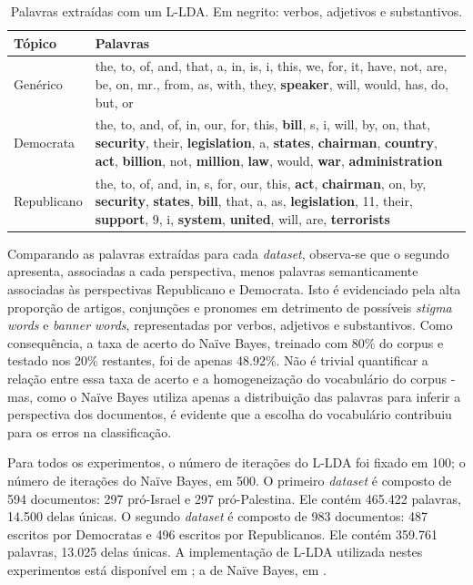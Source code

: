 \begin{table}[h]
\centering
\begin{tabular}{| l | p{10cm} | }
\hline
Tópico & Palavras \\ \hline
Genérico & the, to, of, and, that, a, in, is, i, this, we, for, it, have, not, are, be, on, mr., from, as, with, they, \textbf{speaker}, will, would, has, do, but, or\\ \hline
Democrata & the, to, and, of, in, our, for, this, \textbf{bill}, s, i, will, by, on, that, \textbf{security}, their, \textbf{legislation}, a, \textbf{states}, \textbf{chairman}, \textbf{country}, \textbf{act}, \textbf{billion}, not, \textbf{million}, \textbf{law}, would, \textbf{war}, \textbf{administration} \\ \hline
Republicano & the, to, of, and, in, s, for, our, this, \textbf{act}, \textbf{chairman}, on, by, \textbf{security}, \textbf{states}, \textbf{bill}, that, a, as, \textbf{legislation}, 11, their, \textbf{support}, 9, i, \textbf{system}, \textbf{united}, will, are, \textbf{terrorists} \\ \hline
\end{tabular}
\label{tab}
\caption{Palavras extraídas com um L-LDA. Em negrito: verbos, adjetivos e substantivos.}
\end{table}

Comparando as palavras extraídas para cada \emph{dataset}, observa-se que o segundo apresenta, associadas a cada perspectiva, menos palavras semanticamente associadas às perspectivas Republicano e Democrata. Isto é evidenciado pela alta proporção de artigos, conjunções e pronomes em detrimento de possíveis \emph{stigma words} e \emph{banner words}, representadas por verbos, adjetivos e substantivos. Como consequência, a taxa de acerto do Naïve Bayes, treinado com 80\% do corpus e testado nos 20\% restantes, foi de apenas 48.92\%. Não é trivial quantificar a relação entre essa taxa de acerto e a homogeneização do vocabulário do corpus - mas, como o Naïve Bayes utiliza apenas a distribuição das palavras para inferir a perspectiva dos documentos, é evidente que a escolha do vocabulário contribuiu para os erros na classificação.

Para todos os experimentos, o número de iterações do L-LDA foi fixado em 100; o número de iterações do Naïve Bayes, em 500. O primeiro \emph{dataset} é composto de 594 documentos: 297 pró-Israel e 297 pró-Palestina. Ele contém 465.422 palavras, 14.500 delas únicas. O segundo \emph{dataset} é composto de 983 documentos: 487 escritos por Democratas e 496 escritos por Republicanos. Ele contém 359.761 palavras, 13.025 delas únicas. A implementação de L-LDA utilizada nestes experimentos está disponível em \cite{top-llda}; a de Naïve Bayes, em \cite{alibezz-nb}.

